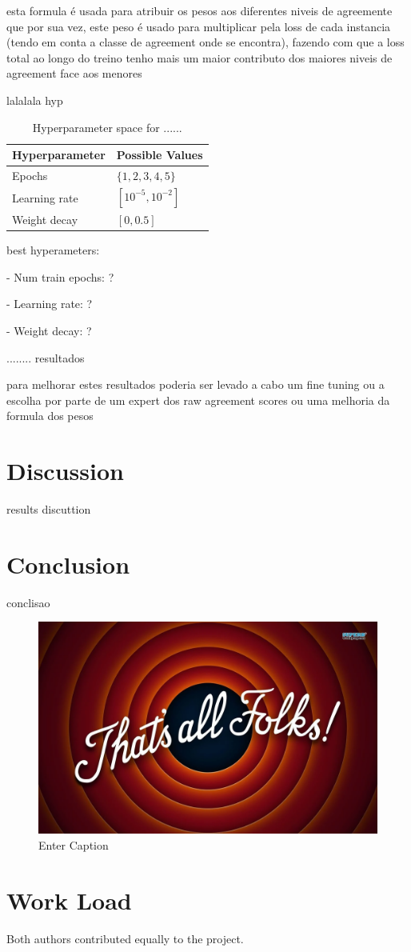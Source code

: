 \documentclass[conference]{IEEEtran}
\begin{document}
esta formula é usada para atribuir os pesos aos diferentes niveis de agreemente que por sua vez, este peso é usado para multiplicar pela loss de cada instancia (tendo em conta a classe de agreement onde se encontra), fazendo com que a loss total ao longo do treino tenho mais um maior contributo dos maiores niveis de agreement face aos menores



lalalala hyp

\begin{table}[H]
\centering
\caption{Hyperparameter space for ......}
\label{parameters_basebert}
\begin{tabular}{ll}
\toprule
\textbf{Hyperparameter} & \textbf{Possible Values} \\
\midrule
Epochs & $\{1,2,3,4,5\}$ \\
Learning rate & $[10^{-5}, 10^{-2}]$ \\
Weight decay & $[0, 0.5]$ \\
\bottomrule
\end{tabular}
\end{table}

best hyperameters: 

- Num train epochs: ?

- Learning rate: ?

- Weight decay: ?


........ resultados


para melhorar estes resultados poderia ser levado a cabo um fine tuning ou a escolha por parte de um expert dos raw agreement scores ou uma melhoria da formula dos pesos





\section{Discussion}

results discuttion



\section{Conclusion}

conclisao

\begin{figure}[H]
    \centering
    \includegraphics[width=0.5\linewidth]{image.png}
    \caption{Enter Caption}
    \label{fig:enter-label}
\end{figure}

\section*{Work Load}

Both authors contributed equally to the project.



\end{document}
